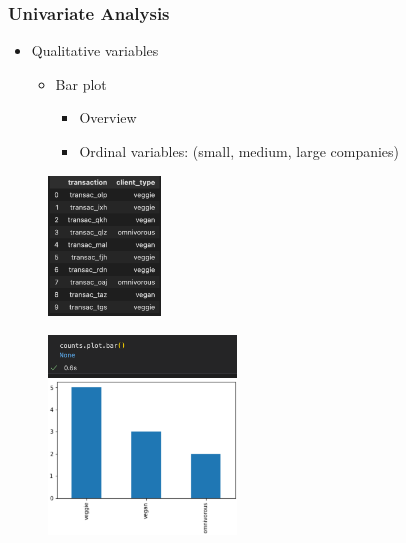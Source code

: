 \begin{frame}\frametitle{Univariate Analysis}
   \begin{minipage}{0.48\linewidth}
      \begin{itemize}
         \item Qualitative variables
         \begin{itemize}
            \item Bar plot
            \begin{itemize}
               \item Overview
               \item Ordinal variables: (small, medium, large companies)
            \end{itemize}
         \end{itemize}
      \end{itemize}
      \vspace{.5cm}
      \begin{figure}[H]
         \includegraphics[width=3cm]{../images/illustrations/pattern_univariate_qualitative_df.png}
      \end{figure}
   \end{minipage}
   \begin{minipage}{0.48\linewidth}
      \begin{figure}[H]
         \includegraphics[width=5cm]{../images/illustrations/pattern_univariate_qualitative_bars.png}
      \end{figure}
   \end{minipage}
\end{frame}



